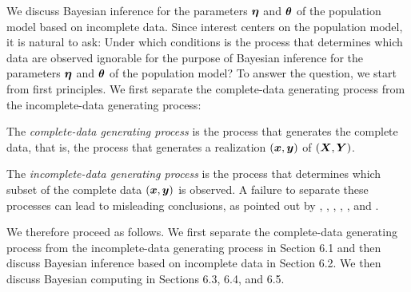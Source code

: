 We discuss Bayesian inference for the parameters $\boldsymbol{\eta}$ and $\boldsymbol{\theta}$ of the population model based on incomplete data.
Since interest centers on the population model,
it is natural to ask:
Under which conditions is the process that determines which data are observed ignorable for the purpose of Bayesian inference for the parameters $\boldsymbol{\eta}$ and $\boldsymbol{\theta}$ of the population model?
To answer the question,
we start from first principles.
We first separate the complete-data generating process from the incomplete-data generating process:
\bi
\item The {\em complete-data generating process} is the process that generates the complete data,
that is,
the process that generates a realization $(\bm{x}, \bm{y})$ of $(\bm{X}, \bm{Y})$.
\item The {\em incomplete-data generating process} is the process that determines which subset of the complete data $(\bm{x}, \bm{y})$ is observed.
\ei
A failure to separate these processes can lead to misleading conclusions,
as pointed out by \citet{Ru76}, \citet{DaDi77}, \citet*{KoRoPa09}, \citet{HaGi09,GiHa17}, \citet{crane2018probabilistic}, and \citet{ScKrBu17}.

We therefore proceed as follows.
We first separate the complete-data generating process from the incomplete-data generating process in Section 6.1
and then discuss Bayesian inference based on incomplete data in Section 6.2.
We then discuss Bayesian computing in Sections 6.3, 6.4, and 6.5.
